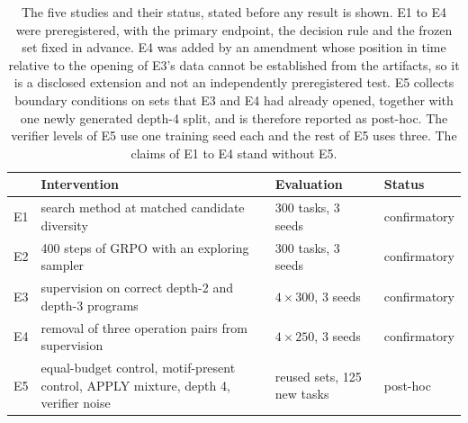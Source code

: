 \begin{table}[!tbh]
\centering\scriptsize\setlength{\tabcolsep}{3pt}
\begin{tabular}{|l|p{.40\linewidth}|p{.19\linewidth}|l|}
\hline
& \textbf{Intervention} & \textbf{Evaluation} & \textbf{Status} \\
\hline
E1 & search method at matched candidate diversity & 300 tasks, 3 seeds & confirmatory \\ \hline
E2 & 400 steps of GRPO with an exploring sampler & 300 tasks, 3 seeds & confirmatory \\ \hline
E3 & supervision on correct depth-2 and depth-3 programs & $4 \times 300$, 3 seeds & confirmatory \\ \hline
E4 & removal of three operation pairs from supervision & $4 \times 250$, 3 seeds & confirmatory \\ \hline
E5 & equal-budget control, motif-present control, APPLY mixture, depth 4, verifier noise & reused sets, 125 new tasks & post-hoc \\ \hline
\end{tabular}
\caption{The five studies and their status, stated before any result is shown. E1
to E4 were preregistered, with the primary endpoint, the decision rule and the
frozen set fixed in advance. E4 was added by an amendment whose position in time
relative to the opening of E3's data cannot be established from the artifacts, so it
is a disclosed extension and not an independently preregistered test. E5 collects
boundary conditions on sets
that E3 and E4 had already opened, together with one newly generated depth-4
split, and is therefore reported as post-hoc. The verifier levels of E5 use one
training seed each and the rest of E5 uses three. The claims of E1 to E4 stand
without E5.}
\label{tab:design}
\end{table}
